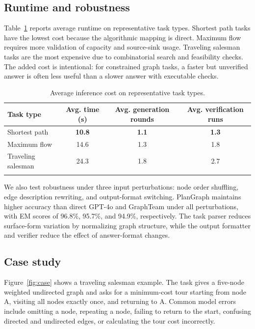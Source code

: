 \documentclass[pdflatex,iicol,sn-mathphys-num]{sn-jnl}
\theoremstyle{thmstyleone}
\theoremstyle{thmstyletwo}
\theoremstyle{thmstylethree}
\begin{document}
\subsection{Runtime and robustness}

Table~\ref{tab:efficiency} reports average runtime on representative task types. Shortest path tasks have the lowest cost because the algorithmic mapping is direct. Maximum flow requires more validation of capacity and source-sink usage. Traveling salesman tasks are the most expensive due to combinatorial search and feasibility checks. The added cost is intentional: for constrained graph tasks, a faster but unverified answer is often less useful than a slower answer with executable checks.

\begin{table}[t]
\caption{Average inference cost on representative task types.}
\label{tab:efficiency}
\begin{tabular}{@{}lccc@{}}
\toprule
Task type & Avg. time (s) & Avg. generation rounds & Avg. verification runs \\
\midrule
Shortest path & \textbf{10.8} & \textbf{1.1} & \textbf{1.3} \\
Maximum flow & 14.6 & 1.3 & 1.8 \\
Traveling salesman & 24.3 & 1.8 & 2.7 \\
\botrule
\end{tabular}
\end{table}

We also test robustness under three input perturbations: node order shuffling, edge description rewriting, and output-format switching. PlanGraph maintains higher accuracy than direct GPT-4o and GraphTeam under all perturbations, with EM scores of 96.8\%, 95.7\%, and 94.9\%, respectively. The task parser reduces surface-form variation by normalizing graph structure, while the output formatter and verifier reduce the effect of answer-format changes.

\subsection{Case study}

Figure~\ref{fig:case} shows a traveling salesman example. The task gives a five-node weighted undirected graph and asks for a minimum-cost tour starting from node A, visiting all nodes exactly once, and returning to A. Common model errors include omitting a node, repeating a node, failing to return to the start, confusing directed and undirected edges, or calculating the tour cost incorrectly.
\end{document}
